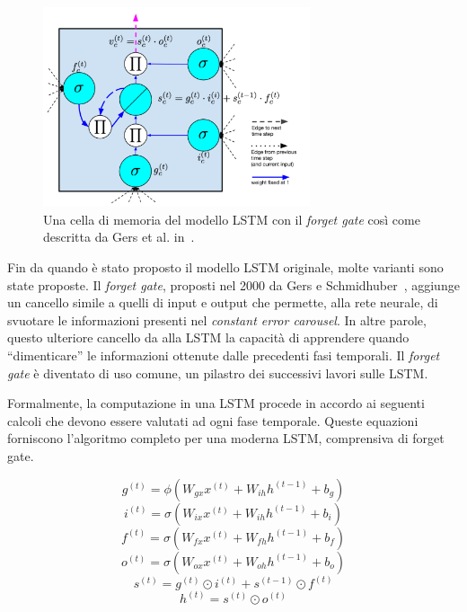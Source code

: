 \begin{figure}[tp]
  \centering
  \begin{center}
    \includegraphics[width=0.7\textwidth]{./images/memoryCellWithForgetGate.png}
  \end{center}
  \caption{Una cella di memoria del modello LSTM con il \emph{forget gate} cos\`i
  come descritta da Gers et al. in~\cite{Gers:2000}.}
  \label{fig:memoryCellWithForgetGate}
\end{figure}

Fin da quando \`e stato proposto il modello LSTM originale, molte varianti sono
state proposte. Il \emph{forget gate}, proposti nel 2000 da Gers e Schmidhuber~\cite{Gers:2000},
aggiunge un cancello simile a quelli di input e output che permette, alla rete
neurale, di svuotare le informazioni presenti nel \emph{constant error carousel}.
In altre parole, questo ulteriore cancello da alla LSTM la capacit\`a di apprendere
quando ``dimenticare'' le informazioni ottenute dalle precedenti fasi temporali.
Il \emph{forget gate} \`e diventato di uso comune, un pilastro dei successivi
lavori sulle LSTM.

Formalmente, la computazione in una LSTM procede in accordo ai seguenti calcoli
che devono essere valutati ad ogni fase temporale. Queste equazioni forniscono
l'algoritmo completo per una moderna LSTM, comprensiva di forget gate.

\begin{equation}
  g^{(t)} = \phi(W_{gx}x^{(t)} + W_{ih}h^{(t-1)} + b_g)
\end{equation}
\begin{equation}
  i^{(t)} = \sigma(W_{ix}x^{(t)} + W_{ih}h^{(t-1)} + b_i)
\end{equation}
\begin{equation}
  f^{(t)} = \sigma(W_{fx}x^{(t)} + W_{fh}h^{(t-1)} + b_f)
\end{equation}
\begin{equation}
  o^{(t)} = \sigma(W_{ox}x^{(t)} + W_{oh}h^{(t-1)} + b_o)
\end{equation}
\begin{equation}
  s^{(t)} = g^{(t)} \odot i^{(t)} + s^{(t-1)} \odot f^{(t)}
\end{equation}
\begin{equation}
  h^{(t)} = s^{(t)} \odot o^{(t)}
\end{equation}

